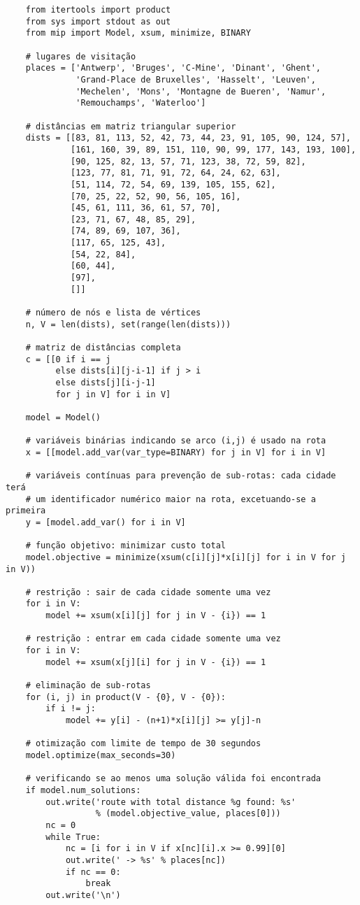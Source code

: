 \documentclass[a4paper,11pt,fleqn]{article}
\begin{document}
\begin{verbatim}
    from itertools import product
    from sys import stdout as out
    from mip import Model, xsum, minimize, BINARY

    # lugares de visitação
    places = ['Antwerp', 'Bruges', 'C-Mine', 'Dinant', 'Ghent',
              'Grand-Place de Bruxelles', 'Hasselt', 'Leuven',
              'Mechelen', 'Mons', 'Montagne de Bueren', 'Namur',
              'Remouchamps', 'Waterloo']

    # distâncias em matriz triangular superior
    dists = [[83, 81, 113, 52, 42, 73, 44, 23, 91, 105, 90, 124, 57],
             [161, 160, 39, 89, 151, 110, 90, 99, 177, 143, 193, 100],
             [90, 125, 82, 13, 57, 71, 123, 38, 72, 59, 82],
             [123, 77, 81, 71, 91, 72, 64, 24, 62, 63],
             [51, 114, 72, 54, 69, 139, 105, 155, 62],
             [70, 25, 22, 52, 90, 56, 105, 16],
             [45, 61, 111, 36, 61, 57, 70],
             [23, 71, 67, 48, 85, 29],
             [74, 89, 69, 107, 36],
             [117, 65, 125, 43],
             [54, 22, 84],
             [60, 44],
             [97],
             []]

    # número de nós e lista de vértices
    n, V = len(dists), set(range(len(dists)))

    # matriz de distâncias completa
    c = [[0 if i == j
          else dists[i][j-i-1] if j > i
          else dists[j][i-j-1]
          for j in V] for i in V]

    model = Model()

    # variáveis binárias indicando se arco (i,j) é usado na rota
    x = [[model.add_var(var_type=BINARY) for j in V] for i in V]

    # variáveis contínuas para prevenção de sub-rotas: cada cidade terá
    # um identificador numérico maior na rota, excetuando-se a primeira
    y = [model.add_var() for i in V]

    # função objetivo: minimizar custo total
    model.objective = minimize(xsum(c[i][j]*x[i][j] for i in V for j in V))

    # restrição : sair de cada cidade somente uma vez
    for i in V:
        model += xsum(x[i][j] for j in V - {i}) == 1

    # restrição : entrar em cada cidade somente uma vez
    for i in V:
        model += xsum(x[j][i] for j in V - {i}) == 1

    # eliminação de sub-rotas
    for (i, j) in product(V - {0}, V - {0}):
        if i != j:
            model += y[i] - (n+1)*x[i][j] >= y[j]-n

    # otimização com limite de tempo de 30 segundos
    model.optimize(max_seconds=30)

    # verificando se ao menos uma solução válida foi encontrada
    if model.num_solutions:
        out.write('route with total distance %g found: %s'
                  % (model.objective_value, places[0]))
        nc = 0
        while True:
            nc = [i for i in V if x[nc][i].x >= 0.99][0]
            out.write(' -> %s' % places[nc])
            if nc == 0:
                break
        out.write('\n')
\end{verbatim}
\end{document}
